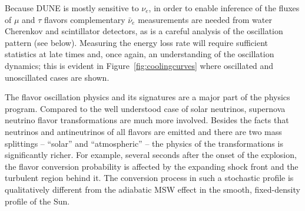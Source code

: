 Because DUNE is mostly sensitive to $\nu_e$, in order to enable inference of the fluxes of $\mu$ and $\tau$ flavors complementary $\bar\nu_{e}$ measurements are needed from water Cherenkov and scintillator detectors, as is a careful analysis of the oscillation pattern (see below). Measuring the energy loss rate will require sufficient statistics at late times and, once again, an understanding of the oscillation dynamics; this is evident in Figure~\ref{fig:coolingcurves} where oscillated and unoscillated cases are shown.


The flavor oscillation physics and its signatures are a major part of the physics program. Compared to the well understood case of solar neutrinos, supernova neutrino flavor transformations are much more involved. Besides the facts that neutrinos and antineutrinos of all flavors are emitted and there are two mass splittings -- ``solar'' and ``atmospheric'' --  the physics of the transformations is significantly richer. For example, several seconds after the onset of the explosion, the flavor conversion probability is affected by the expanding shock front and the turbulent region behind it. The conversion process in such a stochastic profile is qualitatively different from the adiabatic MSW effect in the smooth, fixed-density profile of the Sun. 

